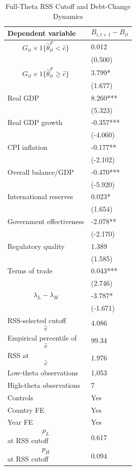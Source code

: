 \begin{table}[H]\centering
\begin{threeparttable}
\caption{Full-Theta RSS Cutoff and Debt-Change Dynamics}
\label{tab:deltaB_rss_cutoff_fulltheta}
\scriptsize
\begin{tabularx}{\textwidth}{lY}
\toprule
Dependent variable & $$B_{i,t+1}-B_{it}$$ \\
\midrule
$$G_{it}\times 1\{\widehat{\theta}^{F}_{it}<\widehat{c}\}$$ & 0.012 \\
 & (0.500) \\
$$G_{it}\times 1\{\widehat{\theta}^{F}_{it}\geq\widehat{c}\}$$ & 3.799* \\
 & (1.677) \\
Real GDP & 8.260*** \\
 & (5.323) \\
Real GDP growth & -0.357*** \\
 & (-4.060) \\
CPI inflation & -0.177** \\
 & (-2.102) \\
Overall balance/GDP & -0.470*** \\
 & (-5.920) \\
International reserves & 0.023* \\
 & (1.654) \\
Government effectiveness & -2.078** \\
 & (-2.170) \\
Regulatory quality & 1.389 \\
 & (1.585) \\
Terms of trade & 0.043*** \\
 & (2.746) \\
$$\lambda_L-\lambda_H$$ & -3.787* \\
 & (-1.671) \\
\midrule
RSS-selected cutoff $$\widehat{c}$$ & 4.086 \\
Empirical percentile of $$\widehat{c}$$ & 99.34 \\
RSS at $$\widehat{c}$$ & 1.976 \\
Low-theta observations & 1,053 \\
High-theta observations & 7 \\
Controls & Yes \\
Country FE & Yes \\
Year FE & Yes \\
$$p_L$$ at RSS cutoff & 0.617 \\
$$p_H$$ at RSS cutoff & 0.094 \\

\end{tabularx}
\end{threeparttable}
\end{table}
